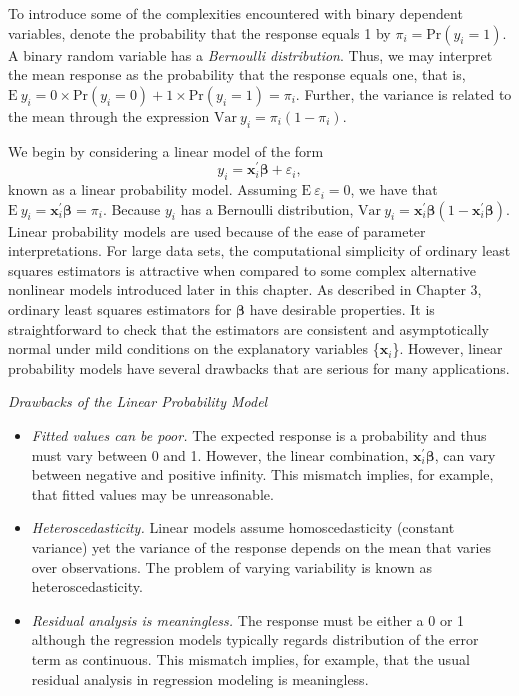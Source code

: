 To introduce some of the complexities encountered with binary
dependent variables, denote the probability that the response equals
1 by $\pi_i= \mathrm{Pr}(y_i=1)$. A binary random
variable has a \emph{Bernoulli distribution}. Thus, we may interpret
the mean response as the probability that the response equals
one, that is, $\mathrm{E~}y_i=0\times \mathrm{Pr}(y_i=0) + 1 \times
\mathrm{Pr}(y_i=1) = \pi_i$. Further, the variance is related to the
mean through the expression $\mathrm{Var}~y_i = \pi_i(1-\pi_i)$.


We begin by considering a linear model of the form%
\begin{equation*}
y_i = \mathbf{x}_i^{\mathbf{\prime}} \boldsymbol \beta +
\varepsilon_i,
\end{equation*}
known as a linear probability model. Assuming
$\mathrm{E~}\varepsilon_i=0$, we have that
$\mathrm{E~}y_i=\mathbf{x}_i^{\mathbf{\prime }} \boldsymbol \beta
=\pi_i$. Because $y_i$ has a Bernoulli distribution,
$\mathrm{Var}~y_i=\mathbf{x}_i^{\mathbf{\prime}} \boldsymbol
\beta(1-\mathbf{x}_i^{\mathbf{\prime}}\boldsymbol \beta)$. Linear
probability models are used because of the ease of parameter
interpretations. For large data sets, the computational simplicity
of ordinary least squares estimators is attractive when compared to
some complex alternative nonlinear models introduced later in this
chapter. As described in Chapter 3, ordinary least squares
estimators for $\boldsymbol \beta$ have desirable properties. It is
straightforward to check that the estimators are consistent and
asymptotically normal under mild conditions on the explanatory
variables \{$\mathbf{x}_i$\}. However, linear probability models
have several drawbacks that are serious for many applications.

\bigskip

\boxedjed

\textit{Drawbacks of the Linear Probability Model}

\begin{itemize}
\item \emph{Fitted values can be poor.} The expected response is a probability and thus must vary between 0
and 1. However, the linear combination,
$\mathbf{x}_i^{\mathbf{\prime}} \boldsymbol \beta$, can vary between
negative and positive infinity. This mismatch implies, for example,
that fitted values may be unreasonable.

\item \emph{Heteroscedasticity.} Linear models assume homoscedasticity (constant variance) yet the
variance of the response depends on the mean that varies over
observations. The problem of varying variability is known as
heteroscedasticity.

\item \emph{Residual analysis is meaningless.} The response must be either a 0 or 1 although the regression models
typically regards distribution of the error term as continuous. This
mismatch implies, for example, that the usual residual analysis in
regression modeling is meaningless.
\end{itemize}

